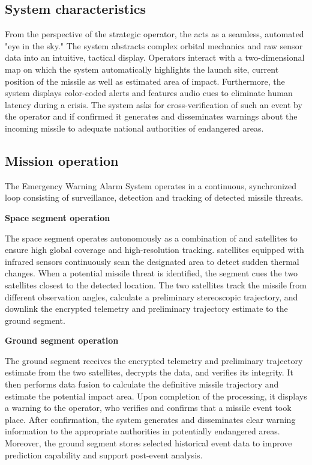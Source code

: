 \subsection{System characteristics}

From the perspective of the strategic operator, the  acts as a seamless, automated "eye in the sky." The system abstracts complex orbital mechanics and raw sensor data into an intuitive, tactical display. Operators interact with a two-dimensional map on which the system automatically highlights the launch site, current position of the missile as well as estimated area of impact.  Furthermore, the system displays color-coded alerts and features audio cues to eliminate human latency during a crisis. The system asks for cross-verification of such an event by the operator and if confirmed it generates and disseminates warnings about the incoming missile to adequate national authorities of endangered areas. 

\subsection{Mission operation}

The Emergency Warning Alarm System operates in a continuous, synchronized loop consisting of surveillance, detection and tracking of detected missile threats. 

\textbf{Space segment operation}

The space segment operates autonomously as a combination of  and  satellites to ensure high global coverage and high-resolution tracking.  satellites equipped with infrared sensors continuously scan the designated area to detect sudden thermal changes. When a potential missile threat is identified, the  segment cues the two  satellites closest to the detected location. The two  satellites track the missile from different observation angles, calculate a preliminary stereoscopic trajectory, and downlink the encrypted telemetry and preliminary trajectory estimate to the ground segment.

\textbf{Ground segment operation}

The ground segment receives the encrypted telemetry and preliminary trajectory estimate from the two  satellites, decrypts the data, and verifies its integrity. It then performs data fusion to calculate the definitive missile trajectory and estimate the potential impact area. Upon completion of the processing, it displays a warning to the operator, who verifies and confirms that a missile event took place. After confirmation, the system generates and disseminates clear warning information to the appropriate authorities in potentially endangered areas. Moreover, the ground segment stores selected historical event data to improve prediction capability and support post-event analysis.

